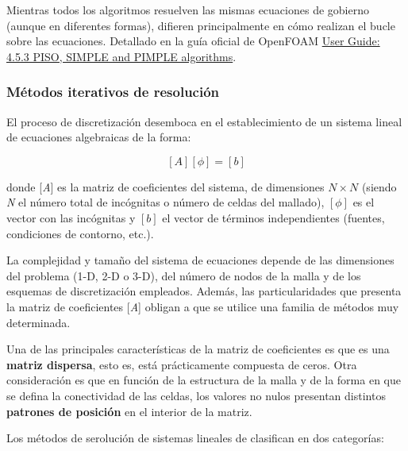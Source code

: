 Mientras todos los algoritmos resuelven las mismas ecuaciones de
gobierno (aunque en diferentes formas), difieren principalmente en cómo
realizan el bucle sobre las ecuaciones. Detallado en la guía oficial de
OpenFOAM
\href{https://cfd.direct/openfoam/user-guide/fvSolution/\#x20-1550004.5.3}{User
Guide: 4.5.3 PISO, SIMPLE and PIMPLE algorithms}.

\subsubsection{Métodos iterativos de
resolución}\label{header-n431}

El proceso de discretización desemboca en el establecimiento de un
sistema lineal de ecuaciones algebraicas de la forma:

\[\left[A\right]\left[\phi\right]=\left[b\right]\]

donde {[}\emph{A}{]} es la matriz de coeficientes del sistema, de
dimensiones \(N\times N\) (siendo \emph{N} el número total de incógnitas
o número de celdas del mallado), \([\phi]\) es el vector con las
incógnitas y \([b]\) el vector de términos independientes (fuentes,
condiciones de contorno, etc.).

La complejidad y tamaño del sistema de ecuaciones depende de las
dimensiones del problema (1-D, 2-D o 3-D), del número de nodos de la
malla y de los esquemas de discretización empleados. Además, las
particularidades que presenta la matriz de coeficientes {[}\emph{A}{]}
obligan a que se utilice una familia de métodos muy determinada.

Una de las principales características de la matriz de coeficientes es
que es una \textbf{matriz dispersa}, esto es, está prácticamente
compuesta de ceros. Otra consideración es que en función de la
estructura de la malla y de la forma en que se defina la conectividad de
las celdas, los valores no nulos presentan distintos \textbf{patrones de
posición} en el interior de la matriz.

Los métodos de serolución de sistemas lineales de clasifican en dos
categorías:

